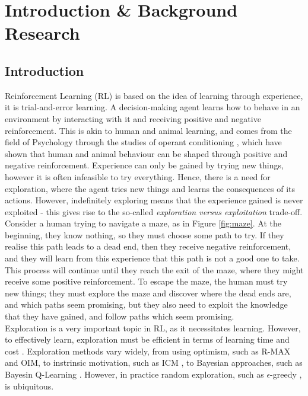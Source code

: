 
\chapter{Introduction \& Background Research}

\label{chapter1}
\section{Introduction}
Reinforcement Learning (RL) \citep{Sutton1998} is based on the idea of learning through experience, it is trial-and-error learning. A decision-making agent learns how to behave in an environment by interacting with it and receiving positive and negative reinforcement. This is akin to human and animal learning, and comes from the field of Psychology through the studies of operant conditioning \citep{nla.cat-vn2770732}, which have shown that human and animal behaviour can be shaped through positive and negative reinforcement. Experience can only be gained by trying new things, however it is often infeasible to try everything. Hence, there is a need for exploration, where the agent tries new things and learns the consequences of its actions. However, indefinitely exploring means that the experience gained is never exploited - this gives rise to the so-called \textit{exploration versus exploitation} trade-off.
\\Consider a human trying to navigate a maze, as in Figure \ref{fig:maze}. At the beginning, they know nothing, so they must choose some path to try. If they realise this path leads to a dead end, then they receive negative reinforcement, and they will learn from this experience that this path is not a good one to take. This process will continue until they reach the exit of the maze, where they might receive some positive reinforcement. To escape the maze, the human must try new things; they must explore the maze and discover where the dead ends are, and which paths seem promising, but they also need to exploit the knowledge that they have gained, and follow paths which seem promising.
\\Exploration is a very important topic in RL, as it necessitates learning. However, to effectively learn, exploration must be efficient in terms of learning time and cost \cite{Thrun-1992-15850}.
Exploration methods vary widely, from  using optimism, such as R-MAX and OIM, to instrinsic motivation, such as ICM \cite{DBLP:journals/corr/PathakAED17}, to Bayesian approaches, such as Bayesin Q-Learning \cite{10.5555/944919.944941}. However, in practice random exploration, such as $\epsilon$-greedy \cite{Watkins:1989, conf/nips/Sutton95}, is ubiquitous.
